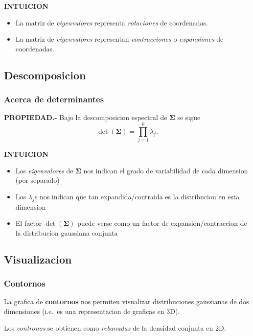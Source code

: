 \documentclass[11pt,]{article}
\begin{document}
\textbf{INTUICION}

\begin{itemize}
\item
  La matriz de \emph{eigenvalores} representa \emph{rotaciones} de
  coordenadas.
\item
  La matriz de \emph{eigenvalores} representan \emph{contracciones} o
  \emph{expansiones} de coordenadas.
\end{itemize}

\subsection{Descomposicion}\label{descomposicion-1}

\subsubsection{Acerca de determinantes}\label{acerca-de-determinantes}

\textbf{PROPIEDAD.-} Bajo la descomposicion espectral de
\(\boldsymbol{\Sigma}\) se sigue
\[\det(\boldsymbol{\Sigma})=\prod_{j=1}^{p}\lambda_j.\]

\textbf{INTUICION}

\begin{itemize}
\item
  Los \emph{eigenvalores} de \(\boldsymbol{\Sigma}\) nos indican el
  grado de variabilidad de cada dimension (por separado)
\item
  Los \(\lambda_j\)s nos indican que tan expandida/contraida es la
  distribucion en esta dimension
\item
  El factor \(\det(\boldsymbol{\Sigma})\) puede verse como un factor de
  expansion/contraccion de la distribucion gaussiana conjunta
\end{itemize}

\subsection{Visualizacion}\label{visualizacion}

\subsubsection{Contornos}\label{contornos}

La grafica de \textbf{contornos} nos permiten visualizar distribuciones
gaussianas de dos dimensiones (i.e.~es una representacion de graficas en
3D).

Los \emph{contronos} se obtienen como \emph{rebanadas} de la densidad
conjunta en 2D.
\end{document}
